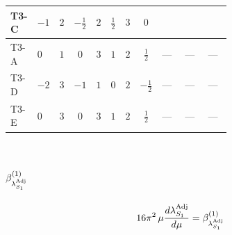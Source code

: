\documentclass[8pt]{article}
\begin{document}
\begin{landscape}
\begin{longtable}{@{}llcccccc >{\raggedright\arraybackslash}p{0.21\linewidth} >{\raggedright\arraybackslash}p{0.21\linewidth} >{\raggedright\arraybackslash}p{0.21\linewidth}@{}}
\midrule
T3-C & $-1$ & $2$ & $-\frac{1}{2}$ & $2$ & $\frac{1}{2}$ & $3$ & $0$ & \scriptsize\adjustbox{max width=\linewidth}{$\begin{gathered} +8 {\lambda_{H2}} {\lambda_{H^\dagger H^\dagger S_2 S_2}}\end{gathered}$} & \scriptsize\adjustbox{max width=\linewidth}{$\begin{gathered} +4 {\lambda_{H2}^{\rm Adj}} {\lambda_{H^\dagger H^\dagger S_2 S_2}}\end{gathered}$} & \scriptsize\adjustbox{max width=\linewidth}{$\begin{gathered} +2 {\lambda_{H^\dagger H^\dagger S_2 S_2}} {\lambda_{S_2}}\end{gathered}$} \\
\midrule
T3-A & $0$ & $1$ & $0$ & $3$ & $1$ & $2$ & $\frac{1}{2}$ & --- & --- & --- \\
\midrule
T3-D & $-2$ & $3$ & $-1$ & $1$ & $0$ & $2$ & $-\frac{1}{2}$ & --- & --- & --- \\
\midrule
T3-E & $0$ & $3$ & $0$ & $3$ & $1$ & $2$ & $\frac{1}{2}$ & --- & --- & --- \\
\midrule
\bottomrule
\end{longtable}
\clearpage
\section*{$\beta_{\lambda_{S_1}^{\rm Adj}}^{(1)}$}
\[16\pi^2\,\mu\frac{d \lambda_{S_1}^{\rm Adj}}{d\mu}=\beta_{\lambda_{S_1}^{\rm Adj}}^{(1)}\]

\end{landscape}
\end{document}

